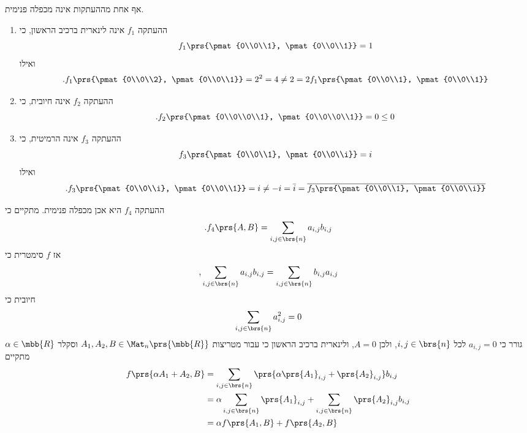 \documentclass[a4paper,10pt,twoside,openany]{book}
\begin{document}
\begin{solution}
אף אחת מההעתקות אינה מכפלה פנימית.
\begin{enumerate}
\item
ההעתקה
$f_1$
אינה לינארית ברכיב הראשון, כי
\[f_1\prs{\pmat{0\\0\\1}, \pmat{0\\0\\1}} = 1\]
ואילו
\[\text{.} f_1\prs{\pmat{0\\0\\2}, \pmat{0\\0\\1}} = 2^2 = 4 \neq 2 = 2 f_1\prs{\pmat{0\\0\\1}, \pmat{0\\0\\1}}\]

\item
ההעתקה
$f_2$
אינה חיובית, כי
\[\text{.} f_2\prs{\pmat{0\\0\\0\\1}, \pmat{0\\0\\0\\1}} = 0 \leq 0\]

\item
ההעתקה
$f_3$
אינה הרמיטית, כי
\[f_3\prs{\pmat{0\\0\\1}, \pmat{0\\0\\i}} = i\]
ואילו
\[\text{.} f_3\prs{\pmat{0\\0\\i}, \pmat{0\\0\\1}} = i \neq -i = \bar{i} = \overline{f_3\prs{\pmat{0\\0\\1}, \pmat{0\\0\\i}}}\]
\end{enumerate}

\item
ההעתקה
$f_4$
היא אכן מכפלה פנימית.
מתקיים כי
\[\text{.} f_4\prs{A,B} = \sum_{i,j \in \brs{n}} a_{i,j} b_{i,j}\]
אז
$f$
סימטרית כי
\[ \text{,} \sum_{i,j \in \brs{n}} a_{i,j} b_{i,j} = \sum_{i,j \in \brs{n}} b_{i,j} a_{i,j} \]
חיובית כי
\[ \sum_{i,j \in \brs{n}} a_{i,j}^2 = 0 \]
גורר כי
$a_{i,j} = 0$
לכל
$i,j \in \brs{n}$,
ולכן
$A = 0$,
ולינארית ברכיב הראשון כי עבור מטריצות
$A_1, A_2, B \in \Mat_n\prs{\mbb{R}}$
וסקלר
$\alpha \in \mbb{R}$
מתקיים
\begin{align*}
f\prs{\alpha A_1 + A_2, B}
&=
\sum_{i,j \in \brs{n}} \prs{\alpha \prs{A_1}_{i,j} + \prs{A_2}_{i,j}} b_{i,j}
\\&=
\alpha \sum_{i,j \in \brs{n}} \prs{A_1}_{i,j} + \sum_{i,j \in \brs{n}} \prs{A_2}_{i,j} b_{i,j}
\\
\hphantom{f\prs{\alpha A_1 + A_2, B}}
&=
\alpha f\prs{A_1, B} + f\prs{A_2, B}
\end{align*}


\end{solution}
\end{document}
